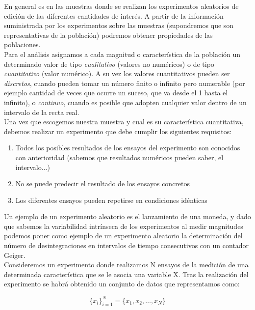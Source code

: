 \documentclass[12pt,a4paper]{book}
\begin{document}
En general es en las muestras donde se realizan los experimentos aleatorios de edición de las diferentes cantidades de interés. A partir de la información suministrada por los experimentos sobre las muestras (supondremos que son representativas de la población) podremos obtener propiedades de las poblaciones. \\

Para el análisis asignamos a cada magnitud o característica de la población un determinado valor de tipo \textit{cualitativo} (valores no numéricos) o de tipo \textit{cuantitativo} (valor numérico). A su vez los valores cuantitativos pueden ser \textit{discretos}, cuando pueden tomar un número finito o infinito pero numerable (por ejemplo cantidad de veces que ocurre un suceso, que va desde el 1 hasta el infinito), o \textit{continuo}, cuando es posible que adopten cualquier valor dentro de un intervalo de la recta real. \\

Una vez que escogemos nuestra muestra y cual es su característica cuantitativa, debemos realizar un experimento que debe cumplir los siguientes requisitos:

\begin{enumerate}

\item Todos los posibles resultados de los ensayos del experimento son conocidos con anterioridad (sabemos que resultados numéricos pueden saber, el intervalo...)
 
\item No se puede predecir el resultado de los ensayos concretos
 
\item Los diferentes ensayos pueden repetirse en condiciones idénticas
\end{enumerate}

Un ejemplo de un experimento aleatorio es el lanzamiento de una moneda, y dado que sabemos la variabilidad intrínseca de los experimentos al medir magnitudes podemos poner como ejemplo de un experimento aleatorio la determinación del número de desintegraciones en intervalos de tiempo consecutivos con un contador Geiger. \\

Consideremos un experimento donde realizamos N ensayos de la medición de una determinada característica que se le asocia una variable X. Tras la realización del experimento se habrá obtenido un conjunto de datos que representamos como:

$$ \{ x_i \}_{i=1}^N = \{ x_1, x_2, \ldots, x_N \} $$ \\ 
\end{document}
